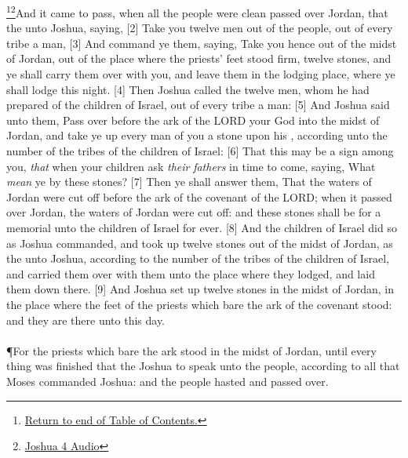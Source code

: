 \footnote{\textcolor[cmyk]{0.99998,1,0,0}{\hyperlink{TOC}{Return to end of Table of Contents.}}}\footnote{\href{https://audiobible.com/bible/joshua_4.html}{\textcolor[cmyk]{0.99998,1,0,0}{Joshua 4 Audio}}}\textcolor[cmyk]{0.99998,1,0,0}{And it came to pass, when all the people were clean passed over Jordan, that the  unto Joshua, saying,}
[2] \textcolor[cmyk]{0.99998,1,0,0}{Take you twelve men out of the people, out of every tribe a man,}
[3] \textcolor[cmyk]{0.99998,1,0,0}{And command ye them, saying, Take you hence out of the midst of Jordan, out of the place where the priests' feet stood firm, twelve stones, and ye shall carry them over with you, and leave them in the lodging place, where ye shall lodge this night.}
[4] \textcolor[cmyk]{0.99998,1,0,0}{Then Joshua called the twelve men, whom he had prepared of the children of Israel, out of every tribe a man:}
[5] \textcolor[cmyk]{0.99998,1,0,0}{And Joshua said unto them, Pass over before the ark of the LORD your God into the midst of Jordan, and take ye up every man of you a stone upon his , according unto the number of the tribes of the children of Israel:}
[6] \textcolor[cmyk]{0.99998,1,0,0}{That this may be a sign among you, \emph{that} when your children ask \emph{their} \emph{fathers} in time to come, saying, What \emph{mean} ye by these stones?}
[7] \textcolor[cmyk]{0.99998,1,0,0}{Then ye shall answer them, That the waters of Jordan were cut off before the ark of the covenant of the LORD; when it passed over Jordan, the waters of Jordan were cut off: and these stones shall be for a memorial unto the children of Israel for ever.}
[8] \textcolor[cmyk]{0.99998,1,0,0}{And the children of Israel did so as Joshua commanded, and took up twelve stones out of the midst of Jordan, as the  unto Joshua, according to the number of the tribes of the children of Israel, and carried them over with them unto the place where they lodged, and laid them down there.}
[9] \textcolor[cmyk]{0.99998,1,0,0}{And Joshua set up twelve stones in the midst of Jordan, in the place where the feet of the priests which bare the ark of the covenant stood: and they are there unto this day.}\\
\\
\P \textcolor[cmyk]{0.99998,1,0,0}{For the priests which bare the ark stood in the midst of Jordan, until every thing was finished that the  Joshua to speak unto the people, according to all that Moses commanded Joshua: and the people hasted and passed over.}
